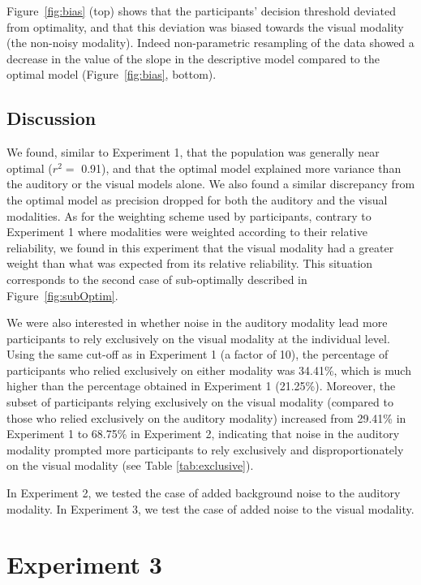 \documentclass[english,floatsintext,man]{apa6}
\theoremstyle{definition}
\theoremstyle{definition}
\theoremstyle{definition}
\theoremstyle{remark}
\begin{document}
Figure~\ref{fig:bias} (top) shows that the participants' decision
threshold deviated from optimality, and that this deviation was biased
towards the visual modality (the non-noisy modality). Indeed
non-parametric resampling of the data showed a decrease in the value of
the slope in the descriptive model compared to the optimal model
(Figure~\ref{fig:bias}, bottom).

\subsection{Discussion}\label{discussion-1}

We found, similar to Experiment 1, that the population was generally
near optimal (\(r^2 =\) 0.91), and that the optimal model explained more
variance than the auditory or the visual models alone. We also found a
similar discrepancy from the optimal model as precision dropped for both
the auditory and the visual modalities. As for the weighting scheme used
by participants, contrary to Experiment 1 where modalities were weighted
according to their relative reliability, we found in this experiment
that the visual modality had a greater weight than what was expected
from its relative reliability. This situation corresponds to the second
case of sub-optimally described in Figure~\ref{fig:subOptim}.

We were also interested in whether noise in the auditory modality lead
more participants to rely exclusively on the visual modality at the
individual level. Using the same cut-off as in Experiment 1 (a factor of
10), the percentage of participants who relied exclusively on either
modality was 34.41\%, which is much higher than the percentage obtained
in Experiment 1 (21.25\%). Moreover, the subset of participants relying
exclusively on the visual modality (compared to those who relied
exclusively on the auditory modality) increased from 29.41\% in
Experiment 1 to 68.75\% in Experiment 2, indicating that noise in the
auditory modality prompted more participants to rely exclusively and
disproportionately on the visual modality (see Table
\ref{tab:exclusive}).

In Experiment 2, we tested the case of added background noise to the
auditory modality. In Experiment 3, we test the case of added noise to
the visual modality.

\section{Experiment 3}\label{experiment-3}
\end{document}
